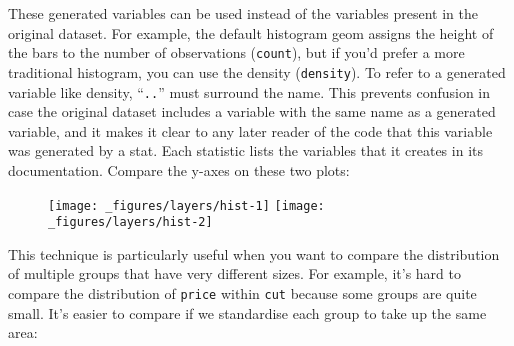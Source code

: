 These generated variables can be used instead of the variables present
in the original dataset. For example, the default histogram geom assigns
the height of the bars to the number of observations (\texttt{count}),
but if you'd prefer a more traditional histogram, you can use the
density (\texttt{density}). To refer to a generated variable like
density, ``\texttt{..}'' must surround the name. This prevents confusion
in case the original dataset includes a variable with the same name as a
generated variable, and it makes it clear to any later reader of the
code that this variable was generated by a stat. Each statistic lists
the variables that it creates in its documentation.  Compare
the y-axes on these two plots:

\begin{Shaded}
\begin{Highlighting}[]
\OperatorTok{+}\StringTok{ }
\StringTok{  }\NormalTok{(} \NormalTok{)}
\OperatorTok{+}\StringTok{ }
\StringTok{  }\NormalTok{(}\NormalTok{(} \NormalTok{)}
\end{Highlighting}
\end{Shaded}

\begin{figure}[H]
  \texttt{[image: \_figures/layers/hist-1]}%
  \texttt{[image: \_figures/layers/hist-2]}
\end{figure}

This technique is particularly useful when you want to compare the
distribution of multiple groups that have very different sizes. For
example, it's hard to compare the distribution of \texttt{price} within
\texttt{cut} because some groups are quite small. It's easier to compare
if we standardise each group to take up the same area:

\begin{Shaded}
\begin{Highlighting}[]
\OperatorTok{+}\StringTok{ }
\StringTok{  }\NormalTok{(} \NormalTok{) }\OperatorTok{+}
\StringTok{  }\NormalTok{(} \NormalTok{)}

\OperatorTok{+}\StringTok{ }
\StringTok{  }\NormalTok{(}\NormalTok{(} \NormalTok{) }\OperatorTok{+}\StringTok{ }
\StringTok{  }\NormalTok{(} \NormalTok{)}
\end{Highlighting}
\end{Shaded}

